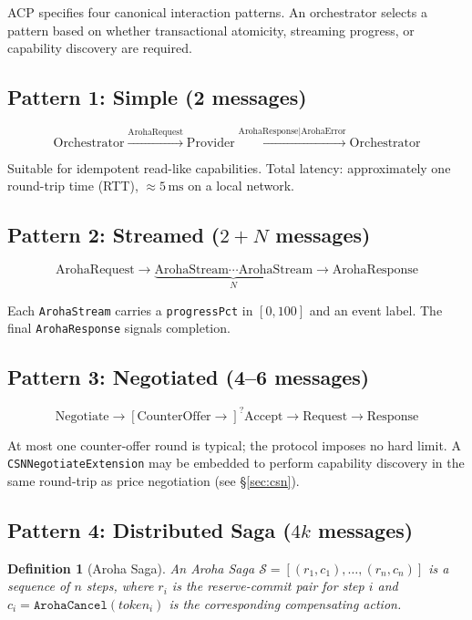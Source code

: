 \documentclass[conference]{IEEEtran}
\newtheorem{definition}{Definition}
\newcommand{\Saga}{\mathcal{S}}
\begin{document}
ACP specifies four canonical interaction patterns.  An orchestrator
selects a pattern based on whether transactional atomicity, streaming
progress, or capability discovery are required.

\subsection{Pattern 1: Simple (2 messages)}

\[
  \text{Orchestrator} \xrightarrow{\text{ArohaRequest}} \text{Provider}
  \xrightarrow{\text{ArohaResponse}|\text{ArohaError}} \text{Orchestrator}
\]

Suitable for idempotent read-like capabilities.  Total latency:
approximately one round-trip time (RTT), $\approx 5\,\text{ms}$ on
a local network.

\subsection{Pattern 2: Streamed ($2 + N$ messages)}

\[
  \text{ArohaRequest} \to
  \underbrace{\text{ArohaStream} \cdots \text{ArohaStream}}_{N}
  \to \text{ArohaResponse}
\]

Each \texttt{ArohaStream} carries a \texttt{progressPct} in $[0,100]$
and an event label.  The final \texttt{ArohaResponse} signals
completion.

\subsection{Pattern 3: Negotiated (4--6 messages)}

\[
  \text{Negotiate} \to [\text{CounterOffer} \to]^{?}
  \text{Accept} \to \text{Request} \to \text{Response}
\]

At most one counter-offer round is typical; the protocol imposes no
hard limit.  A \texttt{CSNNegotiateExtension} may be embedded to
perform capability discovery in the same round-trip as price
negotiation (see \S\ref{sec:csn}).

\subsection{Pattern 4: Distributed Saga ($4k$ messages)}

\begin{definition}[Aroha Saga]
An \emph{Aroha Saga} $\Saga = [(r_1, c_1), \ldots, (r_n, c_n)]$ is a
sequence of $n$ steps, where $r_i$ is the reserve-commit pair for step
$i$ and $c_i = \texttt{ArohaCancel}(\textit{token}_i)$ is the
corresponding compensating action.
\end{definition}
\end{document}
